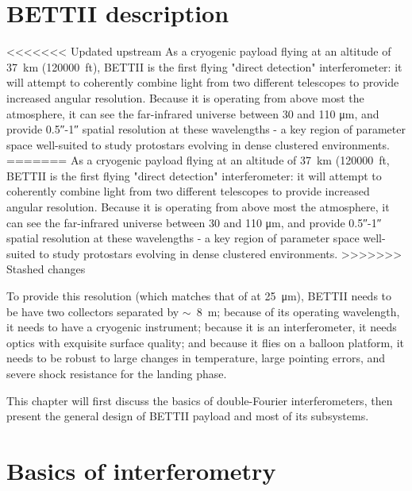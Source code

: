 \section{BETTII description}

<<<<<<< Updated upstream
As a cryogenic payload flying at an altitude of \SI{37}{\kilo\meter} (\num{120000}~ft), BETTII is the first flying "direct detection" interferometer: it will attempt to coherently combine light from two different telescopes to provide increased angular resolution. Because it is operating from above most the atmosphere, it can see the far-infrared universe between 30 and 110 \si{\micro\meter}, and provide \ang{;;0.5}-\ang{;;1} spatial resolution at these wavelengths - a key region of parameter space well-suited to study protostars evolving in dense clustered environments.
=======
As a cryogenic payload flying at an altitude of \SI{37}{\kilo\meter} (\num{120000}~ft, BETTII is the first flying "direct detection" interferometer: it will attempt to coherently combine light from two different telescopes to provide increased angular resolution. Because it is operating from above most the atmosphere, it can see the far-infrared universe between 30 and 110 \si{\micro\meter}, and provide \ang{;;0.5}-\ang{;;1} spatial resolution at these wavelengths - a key region of parameter space well-suited to study protostars evolving in dense clustered environments.
>>>>>>> Stashed changes

To provide this resolution (which matches that of \JWST  at \SI{25}{\micro\meter}), BETTII needs to be have two collectors separated by $\sim$~\SI{8}{\meter}; because of its operating wavelength, it needs to have a cryogenic instrument; because it is an interferometer, it needs optics with exquisite surface quality; and because it flies on a balloon platform, it needs to be robust to large changes in temperature, large pointing errors, and severe shock resistance for the landing phase.

This chapter will first discuss the basics of double-Fourier interferometers, then present the general design of BETTII payload and most of its subsystems.


\section{Basics of interferometry}


